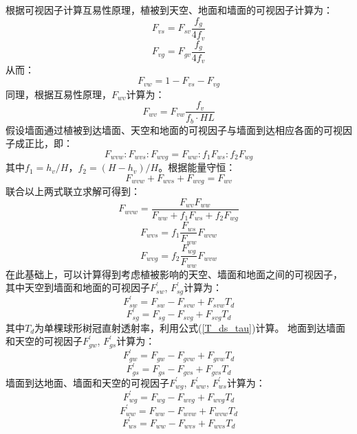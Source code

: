 根据可视因子计算互易性原理，植被到天空、地面和墙面的可视因子计算为：
\begin{equation}
F_{vs}=F_{sv} \frac{f_g}{4 f_v}
\end{equation}
\begin{equation}
F_{vg}=F_{gv} \frac{f_g}{4 f_v}
\end{equation}
从而：
\begin{equation}
F_{v w}=1-F_{v s}-F_{v g}
\end{equation}
同理，根据互易性原理，$F_{wv}$计算为：
\begin{equation}
F_{w v}=F_{v w} \frac{f_{v}}{f_{b} \cdot {HL}}
\end{equation}
假设墙面通过植被到达墙面、天空和地面的可视因子与墙面到达相应各面的可视因子成正比，即：
\begin{equation}
F_{wvw}: F_{wvs}: F_{wvg}=F_{ww}: f_{1} F_{ws}: f_{2} F_{w g}
\end{equation}
其中$f_1=h_v/H$，$f_2=\left(H-h_v\right)/H$。根据能量守恒：
\begin{equation}
F_{wvw}+F_{wvs}+F_{wvg}=F_{w v}
\end{equation}
联合以上两式联立求解可得到：
\begin{equation}
F_{wvw}=\frac{F_{w v} F_{ww}}{F_{ww}+f_{1} F_{ws}+f_{2} F_{w g}}
\end{equation}
\begin{equation}
F_{wvs}=f_{1} \frac{F_{ws}}{F_{ww}} F_{wvw}
\end{equation}
\begin{equation}
F_{wvg}=f_{2} \frac{F_{w g}}{F_{ww}} F_{wvw}
\end{equation}
在此基础上，可以计算得到考虑植被影响的天空、墙面和地面之间的可视因子，
其中天空到墙面和地面的可视因子$F_{sw}^\prime$, $F_{sg}^\prime$计算为：
\begin{equation}
F_{s w}^{\prime}=F_{s w}-F_{s v w}+F_{s v w} T_{d}
\end{equation}
\begin{equation}
F_{s g}^{\prime}=F_{s g}-F_{s v g}+F_{s v g} T_{d}
\end{equation}
其中$T_d$为单棵球形树冠直射透射率，利用公式(\ref{T_ds_tau})计算。
地面到达墙面和天空的可视因子$F_{gw}^\prime$, $F_{gs}^\prime$计算为：
\begin{equation}
F_{g w}^{\prime}=F_{g w}-F_{g v w}+F_{g v w} T_{d}
\end{equation}
\begin{equation}
F_{gs}^{\prime}=F_{gs}-F_{g v s}+F_{g v s} T_{d}
\end{equation}
墙面到达地面、墙面和天空的可视因子$F_{wg}^\prime$, $F_{ww}^\prime$, $F_{ws}^\prime$计算为：
\begin{equation}
F_{w g}^{\prime}=F_{w g}-F_{wvg}+F_{wvg} T_{d}
\end{equation}
\begin{equation}
F_{ww}^{\prime}=F_{ww}-F_{wvw}+F_{wvw} T_{d}
\end{equation}
\begin{equation}
F_{ws}^{\prime}=F_{ww}-F_{wvs}+F_{wvs} T_{d}
\end{equation}

